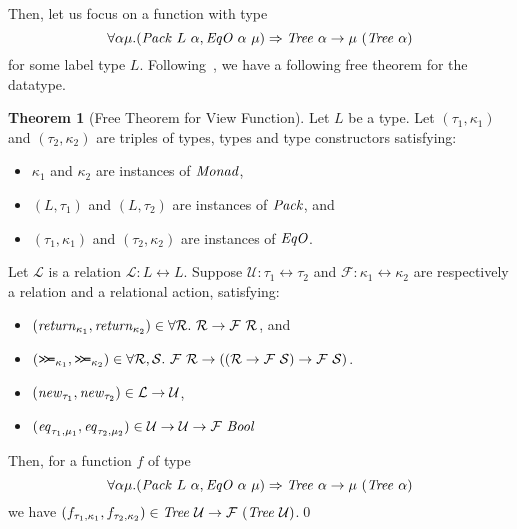 \documentclass{article}
\theoremstyle{definition}
\newtheorem{theorem}{Theorem}
\newcommand{\BIND}{\mathbin{\texttt{>\!>\!=}}}
\newcommand{\BETWEEN}{\leftrightarrow}
\begin{document}
Then, let us focus on a function with type 
\[
\forall \alpha \mu. (\mathit{Pack}~L~\alpha, \mathit{EqO}~\alpha~\mu) \Rightarrow 
 \mathit{Tree}~\alpha \to \mu~(\mathit{Tree}~\alpha)
\]
for some label type $L$.
Following~\cite{Voigtlander09ft}, we have a following free theorem for the datatype.
\begin{theorem}[Free Theorem for View Function]
Let $L$ be a type. 
Let $(\tau_1,\kappa_1)$ and $(\tau_2,\kappa_2)$ are triples of types, types and type constructors satisfying:
\begin{itemize}
 \item $\kappa_1$ and $\kappa_2$ are instances of $\mathit{Monad}$, 
 \item $(L,\tau_1)$ and $(L,\tau_2)$ are instances of $\mathit{Pack}$, and 
 \item $(\tau_1,\kappa_1)$ and $(\tau_2,\kappa_2)$ are instances of $\mathit{EqO}$.
\end{itemize}
Let $\mathcal{L}$ is a relation $\mathcal{L} : L \BETWEEN L$.
Suppose $\mathcal{U} : \tau_1 \BETWEEN \tau_2$
and $\mathcal{F} : \kappa_1 \BETWEEN \kappa_2$ are
respectively a relation and a relational action, satisfying:
\begin{itemize}%
  \item $(\mathit{return}_{\kappa_1}, \mathit{return}_{\kappa_2}) \in 
         \forall \mathcal{R}.~\mathcal{R} \to \mathcal{F}~\mathcal{R}$, and
  \item $(\BIND_{\kappa_1}, \BIND_{\kappa_2}) \in 
    \forall \mathcal{R},\mathcal{S}.~ \mathcal{F}~\mathcal{R} \to ((\mathcal{R} \to \mathcal{F}~\mathcal{S}) \to \mathcal{F}~\mathcal{S})$.
 \item $(\mathit{new}_{\tau_1},\mathit{new}_{\tau_2}) \in \mathcal{L} \to \mathcal{U}$,
 \item $(\mathit{eq}_{\tau_1,\mu_1},\mathit{eq}_{\tau_2,\mu_2}) \in \mathcal{U} \to \mathcal{U} \to \mathcal{F}~\mathit{Bool}$
\end{itemize}
Then, for a function $f$ of type 
\[
\forall \alpha \mu. (\mathit{Pack}~L~\alpha, \mathit{EqO}~\alpha~\mu) \Rightarrow 
 \mathit{Tree}~\alpha \to \mu~(\mathit{Tree}~\alpha)
\]
we have $(f_{\tau_1,\kappa_1},f_{\tau_2,\kappa_2}) \in \mathit{Tree}~\mathcal{U} \to \mathcal{F}~(\mathit{Tree}~\mathcal{U})$.\qed
\label{thm:ft}
\end{theorem}
\end{document}

